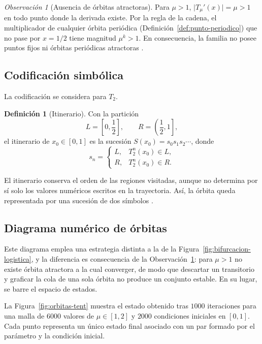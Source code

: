 \documentclass[11pt,letterpaper]{article}
\theoremstyle{definition}
\newtheorem{definicion}[teorema]{Definición}
\theoremstyle{remark}
\newtheorem{observacion}[teorema]{Observación}
\begin{document}
\begin{observacion}[Ausencia de órbitas atractoras]
\label{obs:tent-sin-atractoras}
Para \(\mu>1\), \(\lvert T_\mu'(x)\rvert=\mu>1\) en todo punto donde la derivada existe. Por la regla de la cadena, el multiplicador de cualquier órbita periódica (Definición~\ref{def:punto-periodico}) que no pase por \(x=1/2\) tiene magnitud \(\mu^k>1\). En consecuencia, la familia no posee puntos fijos ni órbitas periódicas atractoras \cite{Devaney1989}.
\end{observacion}

\subsection{Codificación simbólica}

La codificación se considera para \(T_2\).

\begin{definicion}[Itinerario]
\label{def:itinerario}
Con la partición
\[
L=\left[0,\frac12\right],
\qquad
R=\left(\frac12,1\right],
\]
el itinerario de \(x_0\in[0,1]\) es la sucesión \(S(x_0)=s_0s_1s_2\cdots\), donde
\[
s_n=
\begin{cases}
L, & T_2^n(x_0)\in L,\\
R, & T_2^n(x_0)\in R.
\end{cases}
\]
\end{definicion}

El itinerario conserva el orden de las regiones visitadas, aunque no determina por sí solo los valores numéricos escritos en la trayectoria. Así, la órbita queda representada por una sucesión de dos símbolos \cite{Devaney1989,HirschSmaleDevaney2013}.

\subsection{Diagrama numérico de órbitas}

Este diagrama emplea una estrategia distinta a la de la Figura~\ref{fig:bifurcacion-logistica}, y la diferencia es consecuencia de la Observación~\ref{obs:tent-sin-atractoras}: para \(\mu>1\) no existe órbita atractora a la cual converger, de modo que descartar un transitorio y graficar la cola de una sola órbita no produce un conjunto estable. En su lugar, se barre el espacio de estados.

La Figura~\ref{fig:orbitas-tent} muestra el estado obtenido tras \(1000\) iteraciones para una malla de \(6000\) valores de \(\mu\in[1,2]\) y \(2000\) condiciones iniciales en \([0,1]\). Cada punto representa un único estado final asociado con un par formado por el parámetro y la condición inicial.
\end{document}

